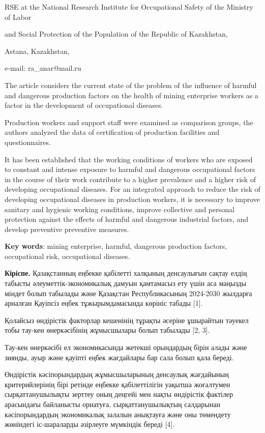 RSE at the National Research Institute for Occupational Safety of the
Ministry of Labor

and Social Protection of the Population of the Republic of Kazakhstan,

Astana, Kazakhstan,

e-mail: ra\_anar@mail.ru

The article considers the current state of the problem of the influence
of harmful and dangerous production factors on the health of mining
enterprise workers as a factor in the development of occupational
diseases.

Production workers and support staff were examined as comparison groups,
the authors analyzed the data of certification of production facilities
and questionnaires.

It has been established that the working conditions of workers who are
exposed to constant and intense exposure to harmful and dangerous
occupational factors in the course of their work contribute to a higher
prevalence and a higher risk of developing occupational diseases. For an
integrated approach to reduce the risk of developing occupational
diseases in production workers, it is necessary to improve sanitary and
hygienic working conditions, improve collective and personal protection
against the effects of harmful and dangerous industrial factors, and
develop preventive preventive measures.

{\bfseries Key words}: mining enterprise, harmful, dangerous production
factors, occupational risk, occupational diseases.

{\bfseries Кіріспе.} Қазақстанның еңбекке қабілетті халқының денсаулығын
сақтау елдің табысты әлеуметтік-экономикалық дамуын қамтамасыз ету үшін
аса маңызды міндет болып табылады және Қазақстан Республикасының
2024-2030 жылдарға арналған Қауіпсіз еңбек тұжырымдамасында көрініс
табады {[}1{]}.

Қолайсыз өндірістік факторлар кешенінің тұрақты әсеріне ұшырайтын
тәуекел тобы тау-кен өнеркәсібінің жұмысшылары болып табылады {[}2,
3{]}.

Тау-кен өнеркәсібі ел экономикасында жетекші орындардың бірін алады және
зиянды, ауыр және қауіпті еңбек жағдайлары бар сала болып қала береді.

Өндірістік кәсіпорындардың жұмысшыларының денсаулық жағдайының
критерийлерінің бірі ретінде еңбекке қабілеттілігін уақытша жоғалтумен
сырқаттанушылықты зерттеу оның деңгейі мен нақты өндірістік фактілер
арасындағы байланысты орнатуға, сырқаттанушылықтың салдарынан
кәсіпорындардың экономикалық залалын анықтауға және оны төмендету
жөніндегі іс-шараларды әзірлеуге мүмкіндік береді {[}4{]}.

